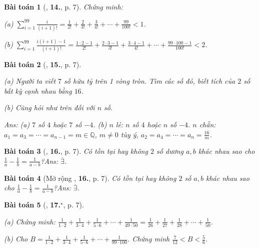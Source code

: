 \documentclass{article}
\numberwithin{equation}{section}
\newtheorem{baitoan}{Bài toán}
\begin{document}
\begin{baitoan}[\cite{Binh_Toan_7_tap_1}, \textbf{14.}, p. 7]
	Chứng minh:\\	
	\begin{enumerate*}
		\item[(a)] $\sum_{i=1}^{99} \frac{i}{(i+1)!} = \frac{1}{2!} + \frac{2}{3!} + \frac{3}{4!} + \cdots + \frac{99}{100!} < 1$.
		\item[(b)] $\sum_{i=1}^{99} \frac{i(i + 1) - 1}{(i+1)!} = \frac{1\cdot 2 - 1}{2!} + \frac{2\cdot 3 - 1}{3!} + \frac{3\cdot 4 - 1}{4!} + \cdots + \frac{99\cdot 100 - 1}{100!} < 2$.
	\end{enumerate*}
\end{baitoan}

\begin{baitoan}[\cite{Binh_Toan_7_tap_1}, \textbf{15.}, p. 7]
	\begin{enumerate*}
		\item[(a)] Người ta viết $7$ số hữu tỷ trên 1 vòng tròn. Tìm các số đó, biết tích của $2$ số bất kỳ cạnh nhau bằng $16$.
		\item[(b)] Cũng hỏi như trên đối với $n$ số.
	\end{enumerate*}\hfill\textsf{Ans:} (a) $7$ số $4$ hoặc $7$ số $-4$. (b) $n$ lẻ: $n$ số $4$ hoặc $n$ số $-4$. $n$ chẵn: $a_1 = a_3 = \cdots = a_{n-1} = m\in\mathbb{Q}$, $m\ne 0$ tùy ý, $a_2 = a_4 = \cdots = a_n = \frac{16}{m}$.
\end{baitoan}

\begin{baitoan}[\cite{Binh_Toan_7_tap_1}, \textbf{16.}, p. 7]
	Có tồn tại hay không $2$ số dương $a,b$ khác nhau sao cho $\frac{1}{a} - \frac{1}{b} = \frac{1}{a - b}$?\hfill\textsf{Ans:} $\overline{\exists}$.
\end{baitoan}

\begin{baitoan}[Mở rộng \cite{Binh_Toan_7_tap_1}, \textbf{16.}, p. 7]
	Có tồn tại hay không $2$ số $a,b$ khác nhau sao cho $\frac{1}{a} - \frac{1}{b} = \frac{1}{a - b}$?\hfill\textsf{Ans:} $\overline{\exists}$.
\end{baitoan}

\begin{baitoan}[\cite{Binh_Toan_7_tap_1}, \textbf{17.}${}^\star$, p. 7]
	\begin{enumerate*}
		\item[(a)] Chứng minh: $\frac{1}{1\cdot 2} + \frac{1}{3\cdot 4} + \frac{1}{5\cdot 6} + \cdots + \frac{1}{49\cdot 50} = \frac{1}{26} + \frac{1}{27} + \frac{1}{28} + \cdots + \frac{1}{50}$.
		\item[(b)] Cho $B = \frac{1}{1\cdot 2} + \frac{1}{3\cdot 4} + \frac{1}{5\cdot 6} + \cdots + \frac{1}{99\cdot 100}$. Chứng minh $\frac{7}{12} < B < \frac{5}{6}$.
	\end{enumerate*}	
\end{baitoan}
\end{document}
